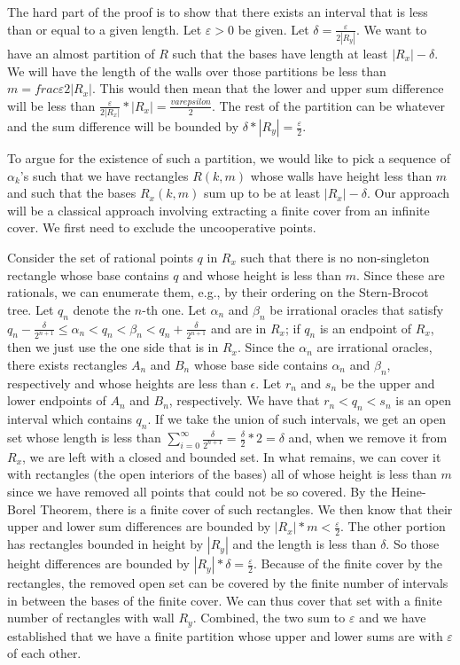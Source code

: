 \documentclass[12pt]{article}
\theoremstyle{remark}
\begin{document}
The hard part of the proof is to show that there exists an interval that is less than or equal to a given length. Let $\varepsilon > 0$ be given. Let $\delta = \frac{\varepsilon}{2|R_y|}$. We want to have an almost partition of $R$ such that the bases have length at least $|R_x| - \delta$. We will have the length of the walls over those partitions be less than $m = frac{\varepsilon}{2|R_x|}$. This would then mean that the lower and upper sum difference will be less than $\frac{\varepsilon}{2|R_x|} * |R_x| = \frac{varepsilon}{2}$. The rest of the partition can be whatever and the sum difference will be bounded by $\delta * |R_y| = \frac{\varepsilon}{2}$.

To argue for the existence of such a partition, we would like to pick a sequence of $\alpha_k$'s such that we have rectangles $R(k, m)$  whose walls have height less than $m$ and such that the bases $R_x (k, m)$ sum up to be at least $|R_x|-\delta$. Our approach will be a classical approach involving extracting a finite cover from an infinite cover. We first need to exclude the uncooperative points. 

Consider the set of rational points $q$ in $R_x$ such that there is no non-singleton rectangle whose base contains $q$ and whose height is less than $m$. Since these are rationals, we can enumerate them, e.g.,  by their ordering on the Stern-Brocot tree. Let $q_n$ denote the $n$-th one. Let $\alpha_n$ and $\beta_n$ be irrational oracles that satisfy $q_n - \frac{\delta}{2^{n+1}} \leq \alpha_n < q_n < \beta_n < q_n + \frac{\delta}{2^{n+1}}$ and are in $R_x$; if $q_n$ is an endpoint of $R_x$, then we just use the one side that is in $R_x$. Since the $\alpha_n$ are irrational oracles, there exists rectangles $A_n$ and $B_n$ whose base side contains $\alpha_n$ and $\beta_n$, respectively and whose heights are less than $\epsilon$. Let $r_n$ and $s_n$ be the upper and lower endpoints of $A_n$ and $B_n$, respectively. We have that $r_n < q_n < s_n$ is an open interval which contains $q_n$. If we take the union of such intervals, we get an open set whose length is less than $\sum_{i=0}^\infty \frac{\delta}{2^{n+1}} = \frac{\delta}{2} * 2 = \delta$ and, when we remove it from $R_x$, we are left with a closed and bounded set. In what remains, we can cover it with rectangles (the open interiors of the bases) all of whose height is less than $m$ since we have removed all points that could not be so covered. By the Heine-Borel Theorem, there is a finite cover of such rectangles. We then know that their upper and lower sum differences are bounded by $|R_x|*m < \frac{\varepsilon}{2}$. The other portion has rectangles bounded in height by $|R_y|$ and the length is less than $\delta$. So those height differences are bounded by $|R_y|*\delta = \frac{\varepsilon}{2}$. Because of the finite cover by the rectangles, the removed open set can be covered by the finite number of intervals in between the bases of the finite cover. We can thus cover that set with a finite number of rectangles with wall $R_y$. Combined, the two sum to $\varepsilon$ and we have established that we have a finite partition whose upper and lower sums are with $\varepsilon$ of each other. 
\end{document}
